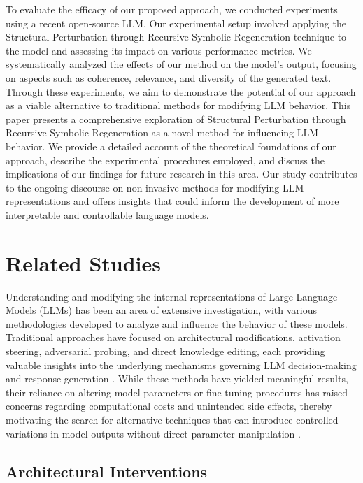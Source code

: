 \documentclass[5p,times]{elsarticle}
\begin{document}
To evaluate the efficacy of our proposed approach, we conducted experiments using a recent open-source LLM. Our experimental setup involved applying the Structural Perturbation through Recursive Symbolic Regeneration technique to the model and assessing its impact on various performance metrics. We systematically analyzed the effects of our method on the model's output, focusing on aspects such as coherence, relevance, and diversity of the generated text. Through these experiments, we aim to demonstrate the potential of our approach as a viable alternative to traditional methods for modifying LLM behavior. This paper presents a comprehensive exploration of Structural Perturbation through Recursive Symbolic Regeneration as a novel method for influencing LLM behavior. We provide a detailed account of the theoretical foundations of our approach, describe the experimental procedures employed, and discuss the implications of our findings for future research in this area. Our study contributes to the ongoing discourse on non-invasive methods for modifying LLM representations and offers insights that could inform the development of more interpretable and controllable language models.




\section{Related Studies}

Understanding and modifying the internal representations of Large Language Models (LLMs) has been an area of extensive investigation, with various methodologies developed to analyze and influence the behavior of these models. Traditional approaches have focused on architectural modifications, activation steering, adversarial probing, and direct knowledge editing, each providing valuable insights into the underlying mechanisms governing LLM decision-making and response generation \cite{santos2024adaptive}. While these methods have yielded meaningful results, their reliance on altering model parameters or fine-tuning procedures has raised concerns regarding computational costs and unintended side effects, thereby motivating the search for alternative techniques that can introduce controlled variations in model outputs without direct parameter manipulation \cite{higasigi2024novel}. 

\subsection{Architectural Interventions}
\end{document}
